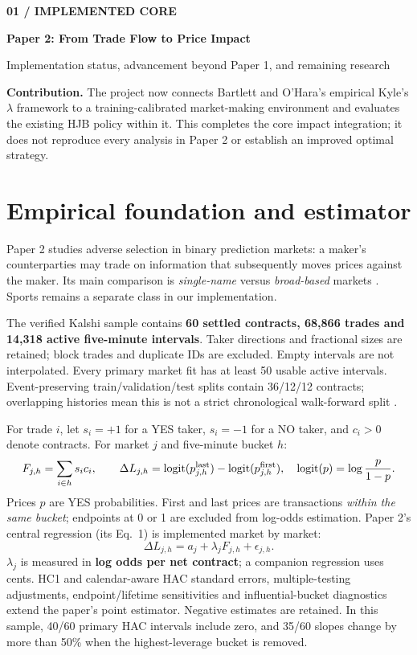 \documentclass[11pt,letterpaper]{article}
\newcommand{\logit}{\operatorname{logit}}
\newcommand{\pagebanner}[2]{%
  {\sffamily\footnotesize\bfseries\color{teal} #1\par}\vspace{3pt}%
  {\sffamily\fontsize{20}{23}\selectfont\bfseries\color{navy} #2\par}\vspace{5pt}}
\newcommand{\takeaway}[1]{%
  \begingroup\setlength{\fboxsep}{8pt}%
  \colorbox{pale}{\parbox{\dimexpr\linewidth-16pt\relax}{#1}}\par\endgroup}
\begin{document}
\fontsize{10}{12}\selectfont

\pagebanner{01 / IMPLEMENTED CORE}{Paper 2: From Trade Flow to Price Impact}
{\sffamily\color{muted} Implementation status, advancement beyond Paper 1, and remaining research}

\takeaway{\textbf{Contribution.} The project now connects Bartlett and O'Hara's empirical Kyle's $\lambda$ framework to a training-calibrated market-making environment and evaluates the existing HJB policy within it. This completes the core impact integration; it does not reproduce every analysis in Paper 2 or establish an improved optimal strategy.}

\section{Empirical foundation and estimator}
Paper 2 studies adverse selection in binary prediction markets: a maker's counterparties may trade on information that subsequently moves prices against the maker. Its main comparison is \emph{single-name} versus \emph{broad-based} markets \cite{bartlett}. Sports remains a separate class in our implementation.

The verified Kalshi sample contains \textbf{60 settled contracts, 68,866 trades and 14,318 active five-minute intervals}. Taker directions and fractional sizes are retained; block trades and duplicate IDs are excluded. Empty intervals are not interpolated. Every primary market fit has at least 50 usable active intervals. Event-preserving train/validation/test splits contain 36/12/12 contracts; overlapping histories mean this is not a strict chronological walk-forward split \cite{repo}.

For trade $i$, let $s_i=+1$ for a YES taker, $s_i=-1$ for a NO taker, and $c_i>0$ denote contracts. For market $j$ and five-minute bucket $h$:
\begin{equation}
 F_{j,h}=\sum_{i\in h}s_i c_i,\qquad
 \Delta L_{j,h}=\logit(p^{\rm last}_{j,h})-\logit(p^{\rm first}_{j,h}),
 \quad \logit(p)=\log\frac{p}{1-p}.
 \label{eq:flow}
\end{equation}
Prices $p$ are YES probabilities. First and last prices are transactions \emph{within the same bucket}; endpoints at 0 or 1 are excluded from log-odds estimation. Paper 2's central regression (its Eq.~1) is implemented market by market:
\begin{equation}
 \Delta L_{j,h}=a_j+\lambda_j F_{j,h}+\epsilon_{j,h}.
 \label{eq:kyle}
\end{equation}
$\lambda_j$ is measured in \textbf{log odds per net contract}; a companion regression uses cents. HC1 and calendar-aware HAC standard errors, multiple-testing adjustments, endpoint/lifetime sensitivities and influential-bucket diagnostics extend the paper's point estimator. Negative estimates are retained. In this sample, 40/60 primary HAC intervals include zero, and 35/60 slopes change by more than 50\% when the highest-leverage bucket is removed.
\end{document}
